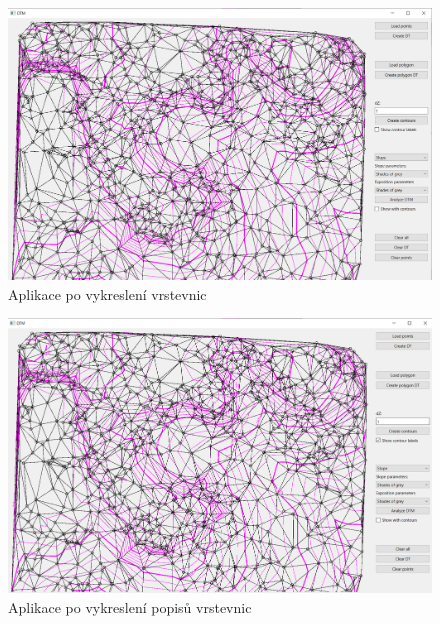 \documentclass[11pt]{article}
\begin{document}
\begin{figure}[htbh]
	\centering
	\captionsetup{justification=centering}
	\includegraphics[scale=0.35]{images/vystup_CreateContours.png} 
	\caption{Aplikace po vykreslení vrstevnic}	\label{fig:vystup_CreateContours}
\end{figure} 
\begin{figure}[htbh]
	\centering
	\captionsetup{justification=centering}
	\includegraphics[scale=0.35]{images/vystup_CreateContourswLabels.png} 
	\caption{Aplikace po vykreslení popisů vrstevnic}	\label{fig:vystup_CreateContourssLabels}
\end{figure} 
\end{document}
